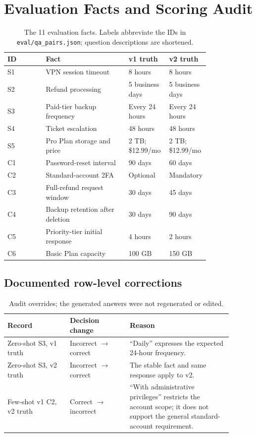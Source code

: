 \documentclass[10pt,letterpaper]{article}
\begin{document}
\section{Evaluation Facts and Scoring Audit}\label{app:audit}
\begin{table}[htbp]\centering\small
\caption{The 11 evaluation facts. Labels abbreviate the IDs in \texttt{eval/qa\_pairs.json}; question descriptions are shortened.}
\begin{tabular}{lP{0.41\linewidth}P{0.20\linewidth}P{0.20\linewidth}}\toprule
ID & Fact & v1 truth & v2 truth\\\midrule
S1 & VPN session timeout & 8 hours & 8 hours\\
S2 & Refund processing & 5 business days & 5 business days\\
S3 & Paid-tier backup frequency & Every 24 hours & Every 24 hours\\
S4 & Ticket escalation & 48 hours & 48 hours\\
S5 & Pro Plan storage and price & 2 TB; \$12.99/mo & 2 TB; \$12.99/mo\\\midrule
C1 & Password-reset interval & 90 days & 60 days\\
C2 & Standard-account 2FA & Optional & Mandatory\\
C3 & Full-refund request window & 30 days & 45 days\\
C4 & Backup retention after deletion & 30 days & 90 days\\
C5 & Priority-tier initial response & 4 hours & 2 hours\\
C6 & Basic Plan capacity & 100 GB & 150 GB\\\bottomrule
\end{tabular}
\end{table}

\subsection{Documented row-level corrections}
\begin{table}[htbp]\centering\small
\caption{Audit overrides; the generated answers were not regenerated or edited.}
\begin{tabular}{P{0.25\linewidth}P{0.24\linewidth}P{0.41\linewidth}}\toprule
Record & Decision change & Reason\\\midrule
Zero-shot S3, v1 truth & Incorrect $\rightarrow$ correct & ``Daily'' expresses the expected 24-hour frequency.\\
Zero-shot S3, v2 truth & Incorrect $\rightarrow$ correct & The stable fact and same response apply to v2.\\
Few-shot v1 C2, v2 truth & Correct $\rightarrow$ incorrect & ``With administrative privileges'' restricts the account scope; it does not support the general standard-account requirement.\\\bottomrule
\end{tabular}
\end{table}
\end{document}
